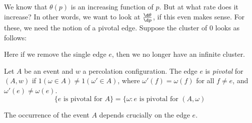 \documentclass[a4paper]{article}
\begin{document}
We know that $\theta(p)$ is an increasing function of $p$. But at what rate does it increase? In other words, we want to look at $\frac{\d \theta}{\d p}$, if this even makes sense. For these, we need the notion of a pivotal edge. Suppose the cluster of $0$ looks as follows:

\begin{center}
\end{center}
Here if we remove the single edge $e$, then we no longer have an infinite cluster.

\begin{defi}
  Let $A$ be an event and $w$ a percolation configuration. The edge $e$ is \emph{pivotal} for $(A, w)$ if $1(\omega \in A) \not= 1(\omega' \in A)$, where $\omega'(f) = \omega(f)$ for all $f \not= e$, and $\omega'(e) \not= \omega(e)$.
  \[
    \{e \text{ is pivotal for $A$}\} = \{\omega: e\text{ is pivotal for $(A, \omega)$}
  \]
\end{defi}
The occurrence of the event $A$ depends crucially on the edge $e$.

\printindex
\end{document}
